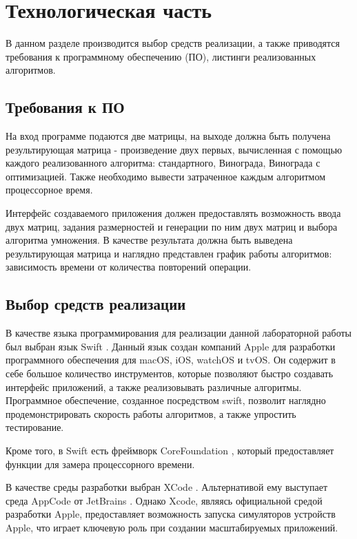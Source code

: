 \chapter{Технологическая часть}

В данном разделе производится выбор средств реализации, а также приводятся требования к программному обеспечению (ПО), листинги реализованных алгоритмов.

\section{Требования к ПО}

На вход программе подаются две матрицы, на выходе должна быть получена результирующая матрица - произведение двух первых, вычисленная с помощью каждого реализованного алгоритма: стандартного, Винограда, Винограда с оптимизацией. Также необходимо вывести затраченное каждым алгоритмом процессорное время.

Интерфейс создаваемого приложения должен предоставлять возможность ввода двух матриц, задания размерностей и генерации по ним двух матриц и выбора алгоритма умножения. В качестве результата должна быть выведена результирующая матрица и наглядно представлен график работы алгоритмов: зависимость времени от количества повторений операции.

\section{Выбор средств реализации}

В качестве языка программирования для реализации данной лабораторной работы был выбран язык Swift \cite{swift}. Данный язык создан компаний Apple для разработки программного обеспечения для macOS, iOS, watchOS и tvOS. Он содержит в себе большое количество инструментов, которые позволяют быстро создавать интерфейс приложений, а также реализовывать различные алгоритмы. Программное обеспечение, созданное посредством swift, позволит наглядно продемонстрировать скорость работы алгоритмов, а также упростить тестирование.

Кроме того, в Swift есть фреймворк CoreFoundation \cite{core}, который предоставляет функции для замера процессорного времени.

В качестве среды разработки выбран XCode \cite{xcode}. Альтернативой ему выступает среда AppCode от JetBrains \cite{appcode}. Однако Xcode, являясь официальной средой разработки Apple, предоставляет возможность запуска симуляторов устройств Apple, что играет ключевую роль при создании масштабируемых приложений.  

